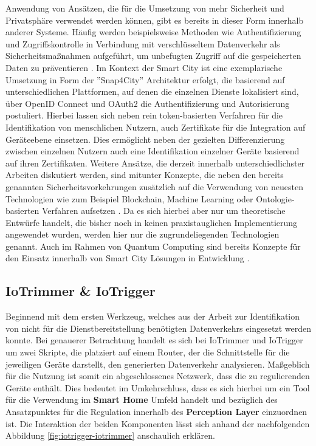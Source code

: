 Anwendung von Ansätzen, die für die Umsetzung von mehr Sicherheit und Privatsphäre verwendet werden können, gibt es bereits in dieser Form innerhalb anderer Systeme. 
Häufig werden beispielsweise Methoden wie Authentifizierung und Zugriffskontrolle in Verbindung mit verschlüsseltem Datenverkehr als Sicherheitsmaßnahmen aufgeführt, um unbefugten Zugriff auf die gespeicherten Daten zu präventieren \cite{SecPrivSmartCity2021}. 
Im Kontext der Smart City ist eine exemplarische Umsetzung in Form der ''Snap4City'' Architektur \cite{Badii2020} erfolgt, die basierend auf unterschiedlichen Plattformen, auf denen die einzelnen Dienste lokalisiert sind, über OpenID Connect und OAuth2 die Authentifizierung und Autorisierung postuliert. 
Hierbei lassen sich neben rein token-basierten Verfahren für die Identifikation von menschlichen Nutzern, auch Zertifikate für die Integration auf Geräteebene einsetzen. 
Dies ermöglicht neben der gezielten Differenzierung zwischen einzelnen Nutzern auch eine Identifikation einzelner Geräte basierend auf ihren Zertifikaten. 
Weitere Ansätze, die derzeit innerhalb unterschiedlichster Arbeiten diskutiert werden, sind mitunter Konzepte, die neben den bereits genannten Sicherheitsvorkehrungen zusätzlich auf die Verwendung von neuesten Technologien wie zum Beispiel Blockchain, Machine Learning oder Ontologie-basierten Verfahren aufsetzen \cite{Cui2018}. 
Da es sich hierbei aber nur um theoretische Entwürfe handelt, die bisher noch in keinen praxistauglichen Implementierung angewendet wurden, werden hier nur die zugrundeliegenden Technologien genannt. 
Auch im Rahmen von Quantum Computing sind bereits Konzepte für den Einsatz innerhalb von Smart City Lösungen in Entwicklung \cite{Bashirpour2022}. 

\subsection{IoTrimmer \& IoTrigger}
\label{sec:Regulationsmöglichkeiten:ssec:IoTrimmer und IoTrigger}

Beginnend mit dem ersten Werkzeug, welches aus der Arbeit \cite{Mandalari2021} zur Identifikation von nicht für die Dienstbereitstellung benötigten Datenverkehrs eingesetzt werden konnte. Bei genauerer Betrachtung handelt es sich bei IoTrimmer und IoTrigger \cite{Mandalari2021} um zwei Skripte, die platziert auf einem Router, der die Schnittstelle für die jeweiligen Geräte darstellt, den generierten Datenverkehr analysieren. 
Maßgeblich für die Nutzung ist somit ein abgeschlossenes Netzwerk, dass die zu regulierenden Geräte enthält. Dies bedeutet im Umkehrschluss, dass es sich hierbei um ein Tool für die Verwendung im \textbf{Smart Home} Umfeld handelt und bezüglich des Ansatzpunktes für die Regulation innerhalb des \textbf{Perception Layer} einzuordnen ist.
Die Interaktion der beiden Komponenten lässt sich anhand der nachfolgenden Abbildung \ref{fig:iotrigger-iotrimmer} anschaulich erklären.

